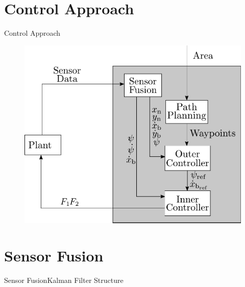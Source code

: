 \section{Control Approach}

\begin{frame}{Control Approach}{}
    \begin{figure}[H]
        \centering
        \includegraphics[width=.6\linewidth]{figures/controllerDiagram2}
    \end{figure}
\end{frame}

\section{Sensor Fusion}

\begin{frame}{Sensor Fusion}{Kalman Filter Structure}
\end{frame}

